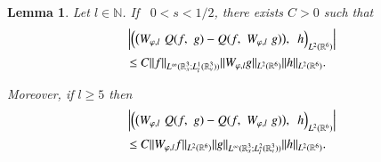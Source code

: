 \documentclass{amsart}[12pt, article]
\newtheorem{lemm}[theo]{Lemma}
\begin{document}
\begin{lemm}\label{moment-commutator-with-x}
Let $l \in {{\mathbb N}}$. If \, $0<s <1/2$, there exists $C >0$ such
that
\begin{align}\label{usual}
&\left|\Big(\big(W_{\varphi,l}  \,\, Q(f,\,\,g)-Q(f,\,\,W_{\varphi,l}  \,\,
g)\big),\,\,\, h\Big)_{L^2({{{\mathbb R}}}^6)}\right| \\
&\leq C
\|f\|_{L^\infty({{{\mathbb R}}}_x^3; L^1_{l}({{{\mathbb R}}}^3_v))} \|W_{\varphi, l} g\|_{L^{2}
({{{\mathbb R}}}^6)} \|h\|_{L^{2}({{{\mathbb R}}}^6)}. \notag
\end{align}

Moreover, if $l \geq 5 $
then
\begin{align}\label{singular}
&\left|\Big(\big(W_{\varphi, l}  \,\, Q(f,\,\,g)-Q(f,\,\,W_{\varphi,l}  \,\,
g)\big),\,\,\, h\Big)_{L^2({{{\mathbb R}}}^6)}\right| \\
&\leq C
\|W_{\varphi, l}f\|_{L^2({{{\mathbb R}}}^6)}\|g\|_{L^\infty({{{\mathbb R}}}^3_x; L^2_{l}({{{\mathbb R}}}^3_v))}
\|h\|_{L^2({{{\mathbb R}}}^6)}. \notag
\end{align}
\end{lemm}
\end{document}
